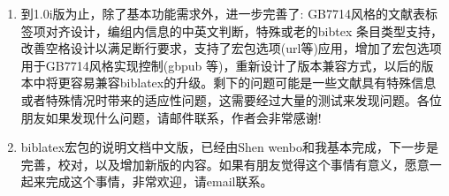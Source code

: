 \begin{enumerate}
  \item 到1.0i版为止，除了基本功能需求外，进一步完善了: GB7714风格的文献表标签项对齐设计，编组内信息的中英文判断，特殊或老的bibtex 条目类型支持，改善空格设计以满足断行要求，支持了宏包选项(url等)应用，增加了宏包选项用于GB7714风格实现控制(gbpub 等)，重新设计了版本兼容方式，以后的版本中将更容易兼容biblatex的升级。剩下的问题可能是一些文献具有特殊信息或者特殊情况时带来的适应性问题，这需要经过大量的测试来发现问题。各位朋友如果发现什么问题，请邮件联系，作者会非常感谢!





  \item biblatex宏包的说明文档中文版，已经由Shen wenbo和我基本完成，下一步是完善，校对，以及增加新版的内容。如果有朋友觉得这个事情有意义，愿意一起来完成这个事情，非常欢迎，请email联系。


\end{enumerate}

